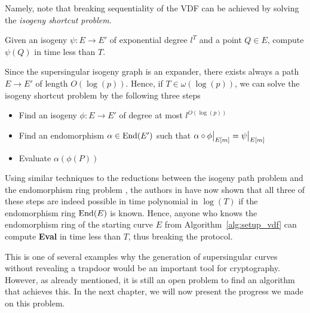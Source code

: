 Namely, note that breaking sequentiality of the VDF can be achieved by solving the \emph{isogeny shortcut problem}.
\begin{problem}
    Given an isogeny $\psi: E \to E'$ of exponential degree $l^T$ and a point $Q \in E$, compute $\psi(Q)$ in time less than $T$.
\end{problem}
Since the supersingular isogeny graph is an expander, there exists always a path $E \to E'$ of length $O(\log(p))$.
Hence, if $T \in \omega(\log(p))$, we can solve the isogeny shortcut problem by the following three steps
\begin{itemize}
    \item Find an isogeny $\phi: E \to E'$ of degree at most $l^{O(\log(p))}$
    \item Find an endomorphism $\alpha \in \mathrm{End}(E')$ such that $\restr{\alpha \circ \phi}{E[m]} = \restr{\psi}{E[m]}$
    \item Evaluate $\alpha(\phi(P))$
\end{itemize}
Using similar techniques to the reductions between the isogeny path problem and the endomorphism ring problem \cite{endomorphism_ring_isogeny_path_equivalent}, the authors in \cite{verifiable_delay_function} have now shown that all three of these steps are indeed possible in time polynomial in $\log(T)$ if the endomorphism ring $\mathrm{End}(E)$ is known.
Hence, anyone who knows the endomorphism ring of the starting curve $E$ from Algorithm~\ref{alg:setup_vdf} can compute \textbf{Eval} in time less than $T$, thus breaking the protocol.

This is one of several examples why the generation of supersingular curves without revealing a trapdoor would be an important tool for cryptography.
However, as already mentioned, it is still an open problem to find an algorithm that achieves this.
In the next chapter, we will now present the progress we made on this problem. 